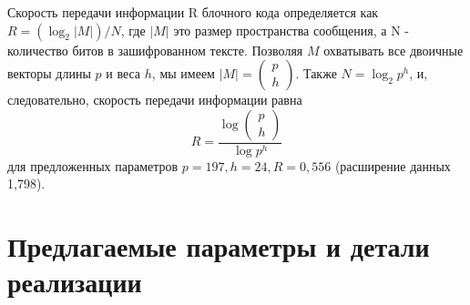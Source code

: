 \documentclass[a4paper,12pt]{article}
\newcommand{\DL}{\newline\newline}
\begin{document}
\indent Скорость передачи информации R блочного кода определяется как $R = (\log_2|M|)/N$, где $|M|$ это размер пространства сообщения, а N - количество битов в зашифрованном тексте. Позволяя $M$ охватывать все двоичные векторы длины $p$ и веса $h$, мы имеем $|M| = \begin{pmatrix}p\\h\end{pmatrix}$. Также $N = \log_2 p^h$, и, следовательно, скорость передачи информации равна
$$R = \frac{\log \begin{pmatrix}p\\h\end{pmatrix}}{\log p^h}$$
для предложенных параметров $p = 197, h = 24, R = 0,556$ (расширение данных 1,798).
\DL

\section{Предлагаемые параметры и детали реализации}
\end{document}
